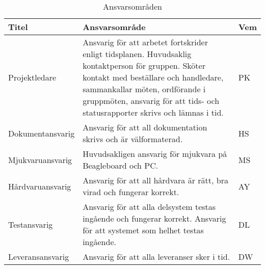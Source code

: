 \begin{table}[h]
  \centering
    \begin{tabularx}{\textwidth}{| l | X | l |}
      \hline
      \textbf{Titel} & \textbf{Ansvarsområde} & \textbf{Vem} \\
      \hline
      {Projektledare} & {Ansvarig för att arbetet fortskrider enligt tidsplanen. Huvudsaklig kontaktperson för gruppen. Sköter kontakt med beställare och handledare, sammankallar möten, ordförande i gruppmöten, ansvarig för att tids- och statusrapporter skrivs och lämnas i tid.} & {PK} \\\hline
      {Dokumentansvarig} & {Ansvarig för att all dokumentation skrivs och är välformaterad.} & {HS} \\\hline
      {Mjukvaruansvarig} & {Huvudsakligen ansvarig för mjukvara på Beagleboard och PC.} & {MS} \\\hline
      {Hårdvaruansvarig} & {Ansvarig för att all hårdvara är rätt, bra virad och fungerar korrekt.} & {AY} \\\hline
      {Testansvarig} & {Ansvarig för att alla delsystem testas ingående och fungerar korrekt. Ansvarig för att systemet som helhet testas ingående.} & {DL} \\\hline
      {Leveransansvarig} & {Ansvarig för att alla leveranser sker i tid.} & {DW} \\\hline
    \end{tabularx}
  \caption{Ansvarsområden} \label{projektplan:ansvarsomraden}
\end{table}
